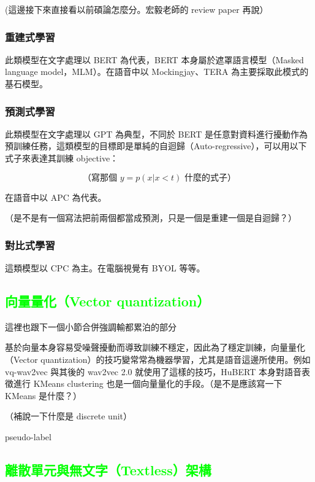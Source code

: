 (這邊接下來直接看以前碩論怎麼分。宏毅老師的 review paper 再說）

\subsubsection{重建式學習}

此類模型在文字處理以 BERT 為代表，BERT 本身屬於遮罩語言模型（Masked language model，MLM）。在語音中以 Mockingjay、TERA 為主要採取此模式的基石模型。

\subsubsection{預測式學習}

此類模型在文字處理以 GPT 為典型，不同於 BERT 是任意對資料進行擾動作為預訓練任務，這類模型的目標即是單純的自迴歸（Auto-regressive），可以用以下式子來表達其訓練 objective：

\[ \mbox{（寫那個 } y = p(x|x<t) \mbox{ 什麼的式子）} \]

在語音中以 APC 為代表。

（是不是有一個寫法把前兩個都當成預測，只是一個是重建一個是自迴歸？）

\subsubsection{對比式學習}

這類模型以 CPC 為主。在電腦視覺有 BYOL 等等。

\subsection{\textcolor{lime}{向量量化（Vector quantization）}} 這裡也跟下一個小節合併強調輸都累泊的部分



基於向量本身容易受噪聲擾動而導致訓練不穩定，因此為了穩定訓練，向量量化（Vector quantization）的技巧變常常為機器學習，尤其是語音這邊所使用。例如 vq-wav2vec 與其後的 wav2vec 2.0 就使用了這樣的技巧，HuBERT 本身對語音表徵進行 KMeans clustering 也是一個向量量化的手段。（是不是應該寫一下 KMeans 是什麼？）

（補說一下什麼是 discrete unit）

pseudo-label 

\subsection{\textcolor{lime}{離散單元與無文字（Textless）架構}}

